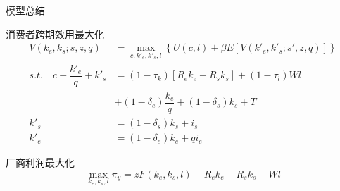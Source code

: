 \documentclass[aspectratio=169,10pt]{beamer}
\begin{document}
\begin{frame}{模型总结}
  \small
  \begin{block}{消费者跨期效用最大化}
    \begin{equation*}
      \begin{aligned}
        V(k_e, k_s; s, z, q)                   & = \max_{c, k'_e, k'_s, l} \left\{  U(c,l) + \beta E[V(k'_e, k'_s; s', z, q)] \right\} \\
        s.t. \quad  c + \dfrac{k'_e}{q} + k'_s & = (1- \tau_k)\left[R_e k_e  + R_s  k_s \right] + (1-\tau_l)W l                        \\
                                               & + (1-\delta_e)\dfrac{k_e}{q} + (1-\delta_s)k_s + T                                    \\
        k'_s                                   & = (1-\delta_s)k_s + i_s                                                               \\
        k'_e                                   & = (1-\delta_e)k_e + q i_e
      \end{aligned}
    \end{equation*}
  \end{block}

  \begin{block}{厂商利润最大化}
    \begin{equation*}
      \max_{{k}_e, {k}_s, {l}} \pi_y = z F({k}_e, {k}_s, {l}) - R_e{k}_e - R_s {k}_s - W{l}
    \end{equation*}
  \end{block}


\end{frame}



\end{document}
